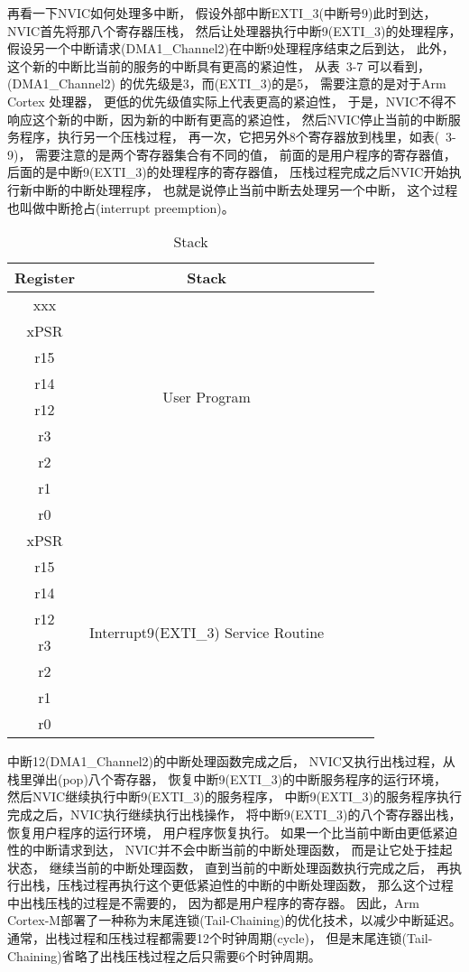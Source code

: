 再看一下NVIC如何处理多中断，
假设外部中断EXTI\_3(中断号9)此时到达，
NVIC首先将那八个寄存器压栈，
然后让处理器执行中断9(EXTI\_3)的处理程序，
假设另一个中断请求(DMA1\_Channel2)在中断9处理程序结束之后到达，
此外，这个新的中断比当前的服务的中断具有更高的紧迫性，
从表~3-7 可以看到，(DMA1\_Channel2) 的优先级是3，而(EXTI\_3)的是5，
需要注意的是对于Arm Cortex 处理器，
更低的优先级值实际上代表更高的紧迫性，
于是，NVIC不得不响应这个新的中断，因为新的中断有更高的紧迫性，
然后NVIC停止当前的中断服务程序，执行另一个压栈过程，
再一次，它把另外8个寄存器放到栈里，如表(~3-9)，
需要注意的是两个寄存器集合有不同的值，
前面的是用户程序的寄存器值，后面的是中断9(EXTI\_3)的处理程序的寄存器值，
压栈过程完成之后NVIC开始执行新中断的中断处理程序，
也就是说停止当前中断去处理另一个中断，
这个过程也叫做中断抢占(interrupt preemption)。
\begin{table}[tb]
    \caption{  Stack }\label{tab:table1}
    \vspace{0.5em}\centering\wuhao
    \begin{tabular}{ccccc}
    \toprule[1.5pt]
    Register & Stack  \\
    \midrule[1pt]
    xxx &   \multirow{8}{*}{User Program} \\ \hline
    xPSR &    \\ 
    r15 &     \\
    r14 &     \\
    r12 &     \\
    r3 &      \\
    r2 &     \\
    r1 &      \\
    r0 &    \\
    \cline{1-2}
    xPSR &  \multirow{8}{*}{Interrupt9(EXTI\_3) Service  Routine} \\
    r15 &   \\
    r14 &   \\
    r12 &   \\
    r3 &    \\
    r2 &   \\
    r1 &    \\
    r0 &     \\
    \bottomrule[1.5pt]
    \end{tabular}
    \vspace{\baselineskip}
\end{table}

中断12(DMA1\_Channel2)的中断处理函数完成之后，
NVIC又执行出栈过程，从栈里弹出(pop)八个寄存器，
恢复中断9(EXTI\_3)的中断服务程序的运行环境，
然后NVIC继续执行中断9(EXTI\_3)的服务程序，
中断9(EXTI\_3)的服务程序执行完成之后，NVIC执行继续执行出栈操作，
将中断9(EXTI\_3)的八个寄存器出栈，恢复用户程序的运行环境，
用户程序恢复执行。
如果一个比当前中断由更低紧迫性的中断请求到达，
NVIC并不会中断当前的中断处理函数，
而是让它处于挂起状态，
继续当前的中断处理函数，
直到当前的中断处理函数执行完成之后，
再执行出栈，压栈过程再执行这个更低紧迫性的中断的中断处理函数，
那么这个过程中出栈压栈的过程是不需要的，
因为都是用户程序的寄存器。
因此，Arm Cortex-M部署了一种称为末尾连锁(Tail-Chaining)的优化技术，以减少中断延迟。
通常，出栈过程和压栈过程都需要12个时钟周期(cycle)，
但是末尾连锁(Tail-Chaining)省略了出栈压栈过程之后只需要6个时钟周期。

